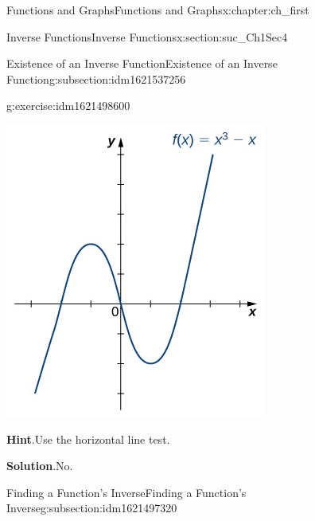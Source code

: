 \documentclass[oneside,10pt,]{book}
\newcommand{\blocktitlefont}{\relax}
\numberwithin{equation}{section}
\begin{document}
\begin{chapterptx}{Functions and Graphs}{}{Functions and Graphs}{}{}{x:chapter:ch_first}
\begin{sectionptx}{Inverse Functions}{}{Inverse Functions}{}{}{x:section:suc_Ch1Sec4}
\begin{subsectionptx}{Existence of an Inverse Function}{}{Existence of an Inverse Function}{}{}{g:subsection:idm1621537256}
\begin{inlineexercise}{}{g:exercise:idm1621498600}
\begin{image}{0.25}{0.5}{0.25}
\includegraphics[width=\linewidth]{external/CNX_Calc_Figure_01_04_007.jpg}
\end{image}%
\par\smallskip%
\noindent\textbf{\blocktitlefont Hint}.\hypertarget{g:hint:idm1621497448}{}\quad{}Use the horizontal line test.%
\par\smallskip%
\noindent\textbf{\blocktitlefont Solution}.\hypertarget{g:solution:idm1621498216}{}\quad{}No.%
\end{inlineexercise}%
\end{subsectionptx}
%
%
\typeout{************************************************}
\typeout{************************************************}
%
\begin{subsectionptx}{Finding a Function’s Inverse}{}{Finding a Function’s Inverse}{}{}{g:subsection:idm1621497320}

\end{subsectionptx}
\end{sectionptx}
\end{chapterptx}
\end{document}
